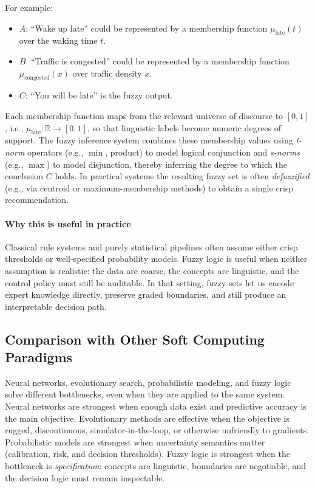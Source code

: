 For example:
\begin{itemize}
    \item $A$: ``Wake up late'' could be represented by a membership function $\mu_{\text{late}}(t)$ over the waking time $t$.
    \item $B$: ``Traffic is congested'' could be represented by a membership function $\mu_{\text{congested}}(x)$ over traffic density $x$.
    \item $C$: ``You will be late'' is the fuzzy output.
\end{itemize}

Each membership function maps from the relevant universe of discourse to $[0,1]$, i.e., $\mu_{\text{late}}: \mathbb{R} \rightarrow [0,1]$, so that linguistic labels become numeric degrees of support. The fuzzy inference system combines these membership values using \emph{t\hyp{}norm} operators (e.g., $\min$, product) to model logical conjunction and \emph{s\hyp{}norms} (e.g., $\max$) to model disjunction, thereby inferring the degree to which the conclusion $C$ holds. In practical systems the resulting fuzzy set is often \emph{defuzzified} (e.g., via centroid or maximum-membership methods) to obtain a single crisp recommendation.

\paragraph{Why this is useful in practice}
Classical rule systems and purely statistical pipelines often assume either crisp thresholds or well-specified probability models. Fuzzy logic is useful when neither assumption is realistic: the data are coarse, the concepts are linguistic, and the control policy must still be auditable. In that setting, fuzzy sets let us encode expert knowledge directly, preserve graded boundaries, and still produce an interpretable decision path.

\subsection{Comparison with Other Soft Computing Paradigms}
\label{sec:softcomp_comparison_with_other_soft_computing_paradigms}

Neural networks, evolutionary search, probabilistic modeling, and fuzzy logic solve different bottlenecks, even when they are applied to the same system. Neural networks are strongest when enough data exist and predictive accuracy is the main objective. Evolutionary methods are effective when the objective is rugged, discontinuous, simulator\hyp{}in\hyp{}the\hyp{}loop, or otherwise unfriendly to gradients. Probabilistic models are strongest when uncertainty semantics matter (calibration, risk, and decision thresholds). Fuzzy logic is strongest when the bottleneck is \emph{specification}: concepts are linguistic, boundaries are negotiable, and the decision logic must remain inspectable.

